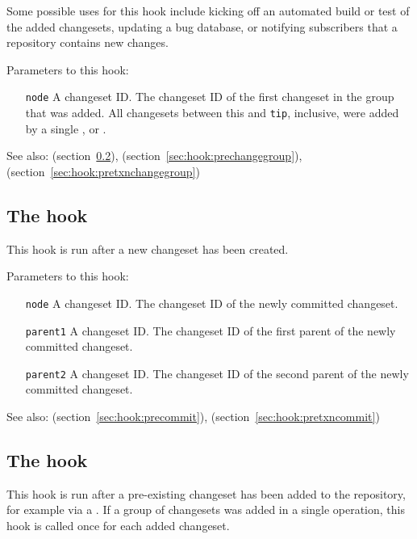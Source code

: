 Some possible uses for this hook include kicking off an automated
build or test of the added changesets, updating a bug database, or
notifying subscribers that a repository contains new changes.

Parameters to this hook:
\begin{itemize}
\item[\texttt{node}] A changeset ID.  The changeset ID of the first
  changeset in the group that was added.  All changesets between this
  and \texttt{tip}, inclusive, were added by
  a single ,  or .
\end{itemize}

See also:  (section~\ref{sec:hook:incoming}),
 (section~\ref{sec:hook:prechangegroup}),
 (section~\ref{sec:hook:pretxnchangegroup})

\subsection{The  hook}
\label{sec:hook:commit}

This hook is run after a new changeset has been created.

Parameters to this hook:
\begin{itemize}
\item[\texttt{node}] A changeset ID.  The changeset ID of the newly
  committed changeset.
\item[\texttt{parent1}] A changeset ID.  The changeset ID of the first
  parent of the newly committed changeset.
\item[\texttt{parent2}] A changeset ID.  The changeset ID of the second
  parent of the newly committed changeset.
\end{itemize}

See also:  (section~\ref{sec:hook:precommit}),
 (section~\ref{sec:hook:pretxncommit})

\subsection{The  hook}
\label{sec:hook:incoming}

This hook is run after a pre-existing changeset has been added to the
repository, for example via a .  If a group of changesets
was added in a single operation, this hook is called once for each
added changeset.

